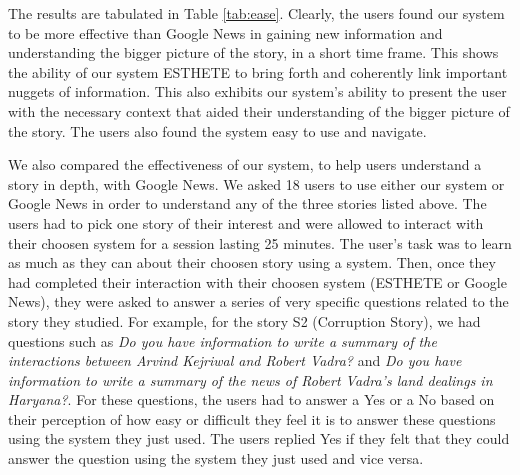 The results are tabulated in Table \ref{tab:ease}.
Clearly, the users found our system to be more effective than Google News in gaining new information and understanding the bigger picture of the story, in a short time frame. This shows the ability of our system ESTHETE to bring forth and coherently link important nuggets of information. This also exhibits our system's ability to present the user with the necessary context that aided their understanding of the bigger picture of the story. The users also found the system easy to use and navigate.


 We also compared the effectiveness of our system, to help users understand a story in depth, with Google News. We asked 18 users to use either our system or Google News in order to understand any of the three stories listed above. The users had to pick one story of their interest and were allowed to interact with their choosen system for a session lasting 25 minutes. The user's task was to learn as much as they can about their choosen story using a system. Then, once they had completed their interaction with their choosen system (ESTHETE or Google News), they were asked to answer a series of very specific questions related to the story they studied. For example, for the story S2 (Corruption Story), we had questions such as \emph{Do you have information to write a summary of the interactions between Arvind Kejriwal and Robert Vadra?} and \emph{Do you have information to write a summary of the news of Robert Vadra's land dealings in Haryana?}. For these questions, the users had to answer a Yes or a No based on their perception of how easy or difficult they feel it is to answer these questions using the system they just used. The users replied Yes if they felt that they could answer the question using the system they just used and vice versa.

